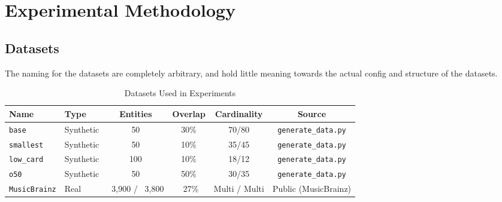 \section{Experimental Methodology}
\label{sec:methodology}

\subsection{Datasets}
\label{sec:datasets}

The naming for the datasets are completely arbitrary, and hold little meaning towards the actual config and structure of the datasets.

\begin{table}[htbp]
	\centering
	\caption{Datasets Used in Experiments}
	\label{tab:datasets}
	\newlength{\oldaboverulesep}
	\newlength{\oldbelowrulesep}
	\setlength{\oldaboverulesep}{\aboverulesep}
	\setlength{\oldbelowrulesep}{\belowrulesep}
	
	\setlength{\aboverulesep}{0pt}
	\setlength{\belowrulesep}{0pt}

	\begin{tabular}{llcccc}
		\toprule
		\rowcolor{gray!15} \textbf{Name} & \textbf{Type} & \textbf{Entities} & \textbf{Overlap} & \textbf{Cardinality} & \textbf{Source} \\
		\midrule
		\noalign{\setlength{\aboverulesep}{\oldaboverulesep}\setlength{\belowrulesep}{\oldbelowrulesep}}
		\texttt{base}         & Synthetic     & 50                & 30\%             & 70/80                & \texttt{generate\_data.py} \\
		\texttt{smallest}          & Synthetic     & 50                & 10\%             & 35/45                & \texttt{generate\_data.py} \\
		\texttt{low\_card}        & Synthetic     & 100               & 10\%             & 18/12                  & \texttt{generate\_data.py} \\
		\texttt{o50}              & Synthetic     & 50             & 50\%             & 30/35              & \texttt{generate\_data.py} \\
		\texttt{MusicBrainz}      & Real  & ~3,900 / ~3,800   & ~27\%            & Multi / Multi        & Public (MusicBrainz)       \\
		\bottomrule
	\end{tabular}
\end{table}

